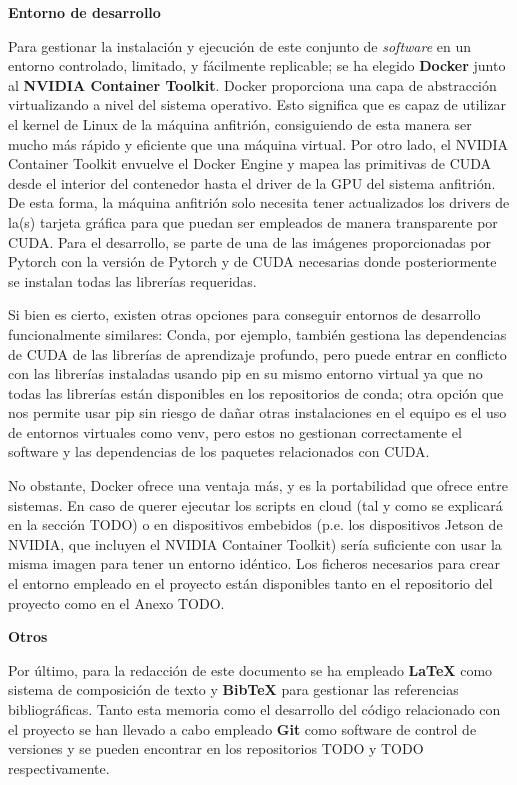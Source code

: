 \textbf{Entorno de desarrollo}

Para gestionar la instalación y ejecución de este conjunto de \textit{software} en un entorno controlado, limitado, y fácilmente replicable; se ha elegido \textbf{Docker} junto al \textbf{NVIDIA Container Toolkit}. Docker proporciona una capa de abstracción virtualizando a nivel del sistema operativo. Esto significa que es capaz de utilizar el kernel de Linux de la máquina anfitrión, consiguiendo de esta manera ser mucho más rápido y eficiente que una máquina virtual. Por otro lado, el NVIDIA Container Toolkit envuelve el Docker Engine y mapea las primitivas de CUDA desde el interior del contenedor hasta el driver de la GPU del sistema anfitrión. De esta forma, la máquina anfitrión solo necesita tener actualizados los drivers de la(s) tarjeta gráfica para que puedan ser empleados de manera transparente por CUDA. Para el desarrollo, se parte de una de las imágenes proporcionadas por Pytorch con la versión de Pytorch y de CUDA necesarias donde posteriormente se instalan todas las librerías requeridas. 

Si bien es cierto, existen otras opciones para conseguir entornos de desarrollo funcionalmente similares: Conda, por ejemplo, también gestiona las dependencias de CUDA de las librerías de aprendizaje profundo, pero puede entrar en conflicto con las librerías instaladas usando pip en su mismo entorno virtual ya que no todas las librerías están disponibles en los repositorios de conda; otra opción que nos permite usar pip sin riesgo de dañar otras instalaciones en el equipo es el uso de entornos virtuales como venv, pero estos no gestionan correctamente el software y las dependencias de los paquetes relacionados con CUDA. 

No obstante, Docker ofrece una ventaja más, y es la portabilidad que ofrece entre sistemas. En caso de querer ejecutar los scripts en cloud (tal y como se explicará en la sección TODO) o en dispositivos embebidos (p.e. los dispositivos Jetson de NVIDIA, que incluyen el NVIDIA Container Toolkit) sería suficiente con usar la misma imagen para tener un entorno idéntico. Los ficheros necesarios para crear el entorno empleado en el proyecto están disponibles tanto en el repositorio del proyecto como en el Anexo TODO.


\textbf{Otros}

Por último, para la redacción de este documento se ha empleado \textbf{LaTeX} como sistema de composición de texto y \textbf{BibTeX} para gestionar las referencias bibliográficas. Tanto esta memoria como el desarrollo del código relacionado con el proyecto se han llevado a cabo empleado \textbf{Git} como software de control de versiones y se pueden encontrar en los repositorios TODO y TODO respectivamente.


